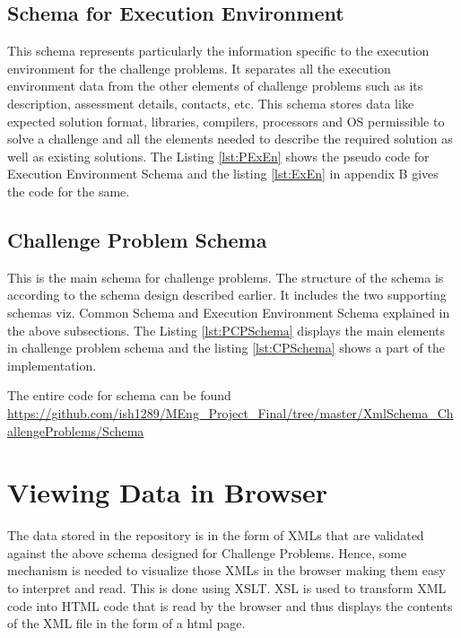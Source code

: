 \documentclass[11pt,letterpaper]{report}
\begin{document}


\subsection{Schema for Execution Environment}
This schema represents particularly the information specific to the execution environment for the challenge problems. It separates all the execution environment data from the other elements of challenge problems such as its description, assessment details, contacts, etc. This schema stores data like expected solution format, libraries, compilers, processors and OS permissible to solve a challenge and  all the elements needed to describe the required solution as well as existing solutions. The Listing \ref{lst:PExEn} shows the pseudo code for Execution Environment Schema and the listing \ref{lst:ExEn} in appendix B gives the code for the same.



\subsection{Challenge Problem Schema}
This is the main schema for challenge problems. The structure of the schema is according to the schema design described earlier. It includes the two supporting schemas viz. Common Schema and Execution Environment Schema explained in the above subsections. The Listing \ref{lst:PCPSchema} displays the main elements in challenge problem schema and the listing \ref{lst:CPSchema} shows a part of the implementation.

The entire code for schema can be found \url{https://github.com/ish1289/MEng_Project_Final/tree/master/XmlSchema_ChallengeProblems/Schema
}



\section{Viewing Data in Browser}
The data stored in the repository is in the form of XMLs that are validated against the above schema designed for Challenge Problems. Hence, some mechanism is needed to visualize those XMLs in the browser making them easy to interpret and read. This is done using XSLT. XSL is used to transform XML code into HTML code that is read by the browser and thus displays the contents of the XML file in the form of a html page. 
\end{document}
